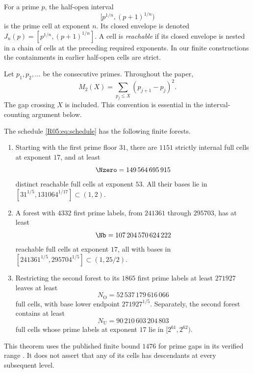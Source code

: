 \documentclass[11pt,a4paper]{article}
\theoremstyle{definition}\newtheorem{definition}[theorem]{Definition}
\theoremstyle{remark}\newtheorem{remark}[theorem]{Remark}
\newcommand{\No}{N_{\mathrm O}}\newcommand{\Nu}{N_{\mathrm U}}
\begin{document}
For a prime $p$, the half-open interval
\[
 [p^{1/n},(p+1)^{1/n})
\]
is the prime cell at exponent $n$. Its closed envelope is denoted
$J_n(p)=[p^{1/n},(p+1)^{1/n}]$.
A cell is \emph{reachable} if its closed envelope is nested in a
chain of cells at the preceding required exponents. In our finite
constructions the containments in earlier half-open cells are strict.

Let $p_1,p_2,\ldots$ be the consecutive primes. Throughout the paper,
\begin{equation}\label{R05:eq:moment}
 M_2(X)=\sum_{p_j\le X}(p_{j+1}-p_j)^2.
\end{equation}
The gap crossing $X$ is included. This convention is essential in the
interval-counting argument below.

\begin{mainthm}\label{R05:thm:finite}
The schedule \eqref{R05:eq:schedule} has the following finite forests.
\begin{enumerate}[label=\textup{(\alph*)}]
\item Starting with the first prime floor $31$, there are $1151$
strictly internal full cells at exponent $17$, and at least
\[
 \Nzero=149\,564\,695\,915
\]
distinct reachable full cells at exponent $53$. All their bases lie
in $[31^{1/5},131064^{1/17}]\subset(1,2)$.
\item A forest with $4332$ first prime labels, from $241361$ through
$295703$, has at least
\[
 \Nb=107\,204\,570\,624\,222
\]
reachable full cells at exponent $17$, all with bases in
$[241361^{1/5},295704^{1/5}]\subset(1,25/2)$.
\item Restricting the second forest to its $1865$ first prime labels
at least $271927$ leaves at least
\[
 \No=52\,537\,179\,616\,066
\]
full cells, with base lower endpoint $271927^{1/5}$.
Separately, the second forest contains at least
\[
 \Nu=90\,210\,603\,204\,803
\]
full cells whose prime labels at exponent $17$ lie in
$[2^{61},2^{62})$.
\end{enumerate}
\end{mainthm}

This theorem uses the published finite bound $1476$ for prime gaps
in its verified range \cite{R05-OHP}. It does not assert that any of its
cells has descendants at every subsequent level.
\end{document}
